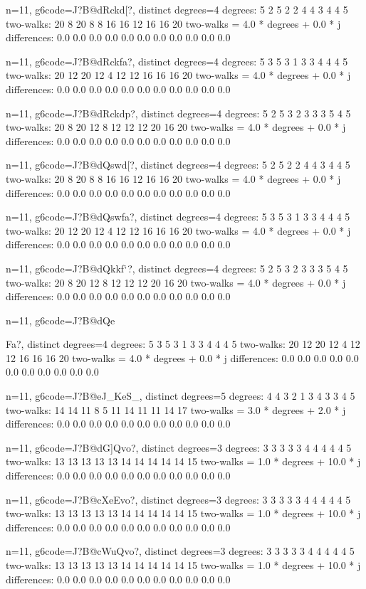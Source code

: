 {{{{{{{{{{{{{n=11, g6code=J?B@dRckd[?, distinct degrees=4
degrees: 5 2 5 2 2 4 4 3 4 4 5 
two-walks: 20 8 20 8 8 16 16 12 16 16 20 
two-walks = 4.0 * degrees + 0.0 * j
differences: 0.0 0.0 0.0 0.0 0.0 0.0 0.0 0.0 0.0 0.0 0.0 

n=11, g6code=J?B@dRckfa?, distinct degrees=4
degrees: 5 3 5 3 1 3 3 4 4 4 5 
two-walks: 20 12 20 12 4 12 12 16 16 16 20 
two-walks = 4.0 * degrees + 0.0 * j
differences: 0.0 0.0 0.0 0.0 0.0 0.0 0.0 0.0 0.0 0.0 0.0 

n=11, g6code=J?B@dRckdp?, distinct degrees=4
degrees: 5 2 5 3 2 3 3 3 5 4 5 
two-walks: 20 8 20 12 8 12 12 12 20 16 20 
two-walks = 4.0 * degrees + 0.0 * j
differences: 0.0 0.0 0.0 0.0 0.0 0.0 0.0 0.0 0.0 0.0 0.0 

n=11, g6code=J?B@dQswd[?, distinct degrees=4
degrees: 5 2 5 2 2 4 4 3 4 4 5 
two-walks: 20 8 20 8 8 16 16 12 16 16 20 
two-walks = 4.0 * degrees + 0.0 * j
differences: 0.0 0.0 0.0 0.0 0.0 0.0 0.0 0.0 0.0 0.0 0.0 

n=11, g6code=J?B@dQswfa?, distinct degrees=4
degrees: 5 3 5 3 1 3 3 4 4 4 5 
two-walks: 20 12 20 12 4 12 12 16 16 16 20 
two-walks = 4.0 * degrees + 0.0 * j
differences: 0.0 0.0 0.0 0.0 0.0 0.0 0.0 0.0 0.0 0.0 0.0 

n=11, g6code=J?B@dQkkf`?, distinct degrees=4
degrees: 5 2 5 3 2 3 3 3 5 4 5 
two-walks: 20 8 20 12 8 12 12 12 20 16 20 
two-walks = 4.0 * degrees + 0.0 * j
differences: 0.0 0.0 0.0 0.0 0.0 0.0 0.0 0.0 0.0 0.0 0.0 

n=11, g6code=J?B@dQe{Fa?, distinct degrees=4
degrees: 5 3 5 3 1 3 3 4 4 4 5 
two-walks: 20 12 20 12 4 12 12 16 16 16 20 
two-walks = 4.0 * degrees + 0.0 * j
differences: 0.0 0.0 0.0 0.0 0.0 0.0 0.0 0.0 0.0 0.0 0.0 

n=11, g6code=J?B@eJ_KeS_, distinct degrees=5
degrees: 4 4 3 2 1 3 4 3 3 4 5 
two-walks: 14 14 11 8 5 11 14 11 11 14 17 
two-walks = 3.0 * degrees + 2.0 * j
differences: 0.0 0.0 0.0 0.0 0.0 0.0 0.0 0.0 0.0 0.0 0.0 

n=11, g6code=J?B@dG]Qvo?, distinct degrees=3
degrees: 3 3 3 3 3 4 4 4 4 4 5 
two-walks: 13 13 13 13 13 14 14 14 14 14 15 
two-walks = 1.0 * degrees + 10.0 * j
differences: 0.0 0.0 0.0 0.0 0.0 0.0 0.0 0.0 0.0 0.0 0.0 

n=11, g6code=J?B@cXeEvo?, distinct degrees=3
degrees: 3 3 3 3 3 4 4 4 4 4 5 
two-walks: 13 13 13 13 13 14 14 14 14 14 15 
two-walks = 1.0 * degrees + 10.0 * j
differences: 0.0 0.0 0.0 0.0 0.0 0.0 0.0 0.0 0.0 0.0 0.0 

n=11, g6code=J?B@cWuQvo?, distinct degrees=3
degrees: 3 3 3 3 3 4 4 4 4 4 5 
two-walks: 13 13 13 13 13 14 14 14 14 14 15 
two-walks = 1.0 * degrees + 10.0 * j
differences: 0.0 0.0 0.0 0.0 0.0 0.0 0.0 0.0 0.0 0.0 0.0 

}}}}}}}}}}}}}}
